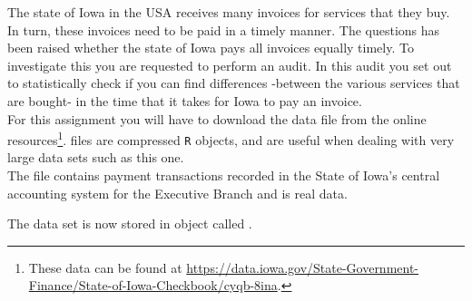 \setcounter{chapter}{6}
\setcounter{section}{5}
\setcounter{question}{0}



The state of Iowa in the USA receives many invoices for services that they buy. In turn, these invoices need to be paid in a timely manner. The questions has been raised whether the state of Iowa pays all invoices equally timely. To investigate this you are requested to perform an audit. In this audit you set out to statistically check if you can find differences -between the various services that are bought- in the time that it takes for Iowa to pay an invoice. \\

For this assignment you will have to download the data file  from the online resources\footnote{These data can be found at \url{https://data.iowa.gov/State-Government-Finance/State-of-Iowa-Checkbook/cyqb-8ina}.}.  files are compressed \texttt{R} objects, and are useful when dealing with very large data sets such as this one. \\

The  file contains payment transactions recorded in the State of Iowa’s central accounting system for the Executive Branch and is real data. \\


The data set is now stored in object called . \\



\twolineanswerbox



